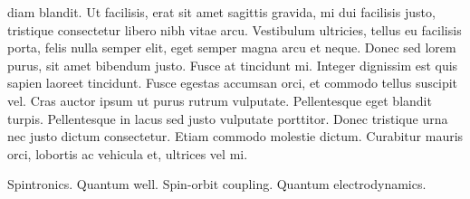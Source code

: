 \begin{resumo}
  diam blandit. Ut facilisis, erat sit amet sagittis gravida, mi dui
  facilisis justo, tristique consectetur libero nibh vitae
  arcu. Vestibulum ultricies, tellus eu facilisis porta, felis nulla
  semper elit, eget semper magna arcu et neque. Donec sed lorem purus,
  sit amet bibendum justo. Fusce at tincidunt mi. Integer dignissim
  est quis sapien laoreet tincidunt. Fusce egestas accumsan orci, et
  commodo tellus suscipit vel. Cras auctor ipsum ut purus rutrum
  vulputate. Pellentesque eget blandit turpis. Pellentesque in lacus
  sed justo vulputate porttitor. Donec tristique urna nec justo dictum
  consectetur. Etiam commodo molestie dictum. Curabitur mauris orci,
  lobortis ac vehicula et, ultrices vel mi.
\end{resumo}

\begin{keywords}
  Spintronics. Quantum well. Spin-orbit coupling. Quantum
  electrodynamics.
\end{keywords}
